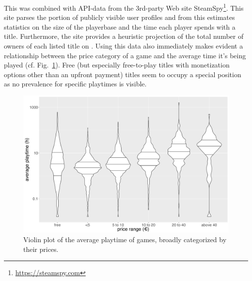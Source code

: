 



This was combined with \acrshort{API}-data from the 3rd-party Web site SteamSpy\footnote{\url{https://steamspy.com}}. This site parses the portion of publicly visible \steam user profiles and from this estimates statistics on the size of the playerbase and the time each player spends with a title. Furthermore, the site provides a heuristic projection of the total number of owners of each listed title on \steam. Using this data also immediately makes evident a relationship between the price category of a game and the average time it's being played (cf. Fig.~\ref{fig:steam-cost-vs-playtime-violin}). Free (but especially free-to-play titles with monetization options other than an upfront payment) titles seem to occupy a special position as no prevalence for specific playtimes is visible. 



\begin{figure}[!t]
	\centering
	\includegraphics[width=1.0\columnwidth]{images/steam-cost-vs-playtime-non-sale.pdf}
	\caption{Violin plot of the average playtime of \steam games, broadly categorized by their prices.}
\label{fig:steam-cost-vs-playtime-violin}
\end{figure}



